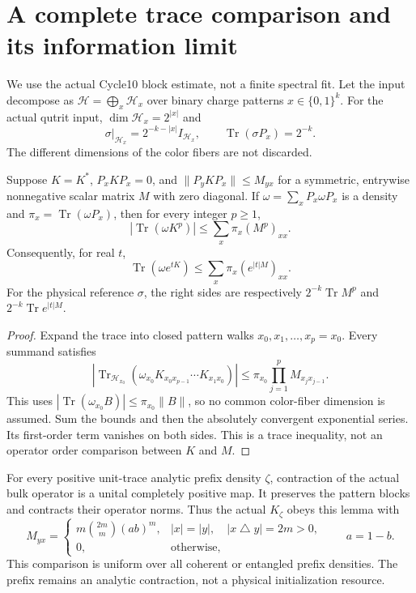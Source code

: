 
\section{A complete trace comparison and its information limit}
\label{sec:moment-comparison}

We use the actual Cycle10 block estimate, not a finite spectral fit.
Let the input decompose as $\mathcal H=\bigoplus_x\mathcal H_x$ over
binary charge patterns $x\in\{0,1\}^k$. For the actual qutrit input,
$\dim\mathcal H_x=2^{|x|}$ and
\[
 \sigma|_{\mathcal H_x}=2^{-k-|x|}I_{\mathcal H_x},\qquad
 \operatorname{Tr}(\sigma P_x)=2^{-k}.
\]
The different dimensions of the color fibers are not discarded.

\begin{lemma}\label{lem:closedwalk}
Suppose $K=K^*$, $P_xKP_x=0$, and
$\|P_yKP_x\|\le M_{yx}$ for a symmetric, entrywise nonnegative scalar
matrix $M$ with zero diagonal. If $\omega=\sum_xP_x\omega P_x$ is a
density and $\pi_x=\operatorname{Tr}(\omega P_x)$, then for every
integer $p\ge1$,
\[
 \left|\operatorname{Tr}(\omega K^p)\right|
 \le\sum_x\pi_x(M^p)_{xx}.
\]
Consequently, for real $t$,
\[
 \operatorname{Tr}(\omega e^{tK})
 \le\sum_x\pi_x(e^{|t|M})_{xx}.
\]
For the physical reference $\sigma$, the right sides are respectively
$2^{-k}\operatorname{Tr}M^p$ and $2^{-k}\operatorname{Tr}e^{|t|M}$.
\end{lemma}
\begin{proof}
Expand the trace into closed pattern walks $x_0,x_1,\ldots,x_p=x_0$.
Every summand satisfies
\[
 \left|\operatorname{Tr}_{\mathcal H_{x_0}}
   (\omega_{x_0}K_{x_0x_{p-1}}\cdots K_{x_1x_0})\right|
 \le\pi_{x_0}\prod_{j=1}^p M_{x_jx_{j-1}}.
\]
This uses $|\operatorname{Tr}(\omega_{x_0}B)|
\le\pi_{x_0}\|B\|$, so no common color-fiber dimension is assumed.
Sum the bounds and then the absolutely convergent exponential series.
Its first-order term vanishes on both sides. This is a trace inequality,
not an operator order comparison between $K$ and $M$.
\end{proof}

For every positive unit-trace analytic prefix density $\zeta$, contraction
of the actual bulk operator is a unital completely positive map. It
preserves the pattern blocks and contracts their operator norms. Thus the
actual $K_\zeta$ obeys this lemma with
\begin{equation}\label{eq:scalar-majorant}
 M_{yx}=\begin{cases}
 m\binom{2m}{m}(ab)^m,
 &|x|=|y|,\quad |x\mathbin\triangle y|=2m>0,\\
 0,&\text{otherwise},
 \end{cases}\qquad a=1-b.
\end{equation}
This comparison is uniform over all coherent or entangled prefix
densities. The prefix remains an analytic contraction, not a physical
initialization resource.

